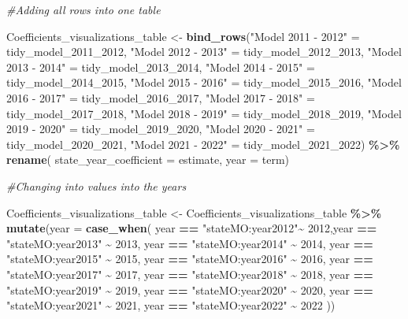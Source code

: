 \documentclass[
]{article}
\newenvironment{Shaded}{\begin{snugshade}}{\end{snugshade}}
\newcommand{\AttributeTok}[1]{\textcolor[rgb]{0.13,0.29,0.53}{#1}}
\newcommand{\CommentTok}[1]{\textcolor[rgb]{0.56,0.35,0.01}{\textit{#1}}}
\newcommand{\DecValTok}[1]{\textcolor[rgb]{0.00,0.00,0.81}{#1}}
\newcommand{\FunctionTok}[1]{\textcolor[rgb]{0.13,0.29,0.53}{\textbf{#1}}}
\newcommand{\NormalTok}[1]{#1}
\newcommand{\OtherTok}[1]{\textcolor[rgb]{0.56,0.35,0.01}{#1}}
\newcommand{\SpecialCharTok}[1]{\textcolor[rgb]{0.81,0.36,0.00}{\textbf{#1}}}
\newcommand{\StringTok}[1]{\textcolor[rgb]{0.31,0.60,0.02}{#1}}
\begin{document}
\begin{Shaded}
\begin{Highlighting}[]
\CommentTok{\#Adding all rows into one table}

\NormalTok{Coefficients\_visualizations\_table }\OtherTok{\textless{}{-}} \FunctionTok{bind\_rows}\NormalTok{(}\StringTok{"Model 2011 {-} 2012"} \OtherTok{=}\NormalTok{ tidy\_model\_2011\_2012, }\StringTok{"Model 2012 {-} 2013"} \OtherTok{=}\NormalTok{ tidy\_model\_2012\_2013, }\StringTok{"Model 2013 {-} 2014"} \OtherTok{=}\NormalTok{ tidy\_model\_2013\_2014, }\StringTok{"Model 2014 {-} 2015"} \OtherTok{=}\NormalTok{ tidy\_model\_2014\_2015, }\StringTok{"Model 2015 {-} 2016"} \OtherTok{=}\NormalTok{ tidy\_model\_2015\_2016, }\StringTok{"Model 2016 {-} 2017"} \OtherTok{=}\NormalTok{ tidy\_model\_2016\_2017, }\StringTok{"Model 2017 {-} 2018"} \OtherTok{=}\NormalTok{ tidy\_model\_2017\_2018, }\StringTok{"Model 2018 {-} 2019"} \OtherTok{=}\NormalTok{ tidy\_model\_2018\_2019, }\StringTok{"Model 2019 {-} 2020"} \OtherTok{=}\NormalTok{ tidy\_model\_2019\_2020, }\StringTok{"Model 2020 {-} 2021"} \OtherTok{=}\NormalTok{ tidy\_model\_2020\_2021, }\StringTok{"Model 2021 {-} 2022"} \OtherTok{=}\NormalTok{ tidy\_model\_2021\_2022) }\SpecialCharTok{\%\textgreater{}\%} \FunctionTok{rename}\NormalTok{( }\AttributeTok{state\_year\_coefficient =}\NormalTok{ estimate, }\AttributeTok{year =}\NormalTok{ term)}

\CommentTok{\#Changing into values into the years}

\NormalTok{Coefficients\_visualizations\_table }\OtherTok{\textless{}{-}}\NormalTok{ Coefficients\_visualizations\_table }\SpecialCharTok{\%\textgreater{}\%}
  \FunctionTok{mutate}\NormalTok{(}\AttributeTok{year =} \FunctionTok{case\_when}\NormalTok{( year }\SpecialCharTok{==} \StringTok{"stateMO:year2012"}\SpecialCharTok{\textasciitilde{}} \DecValTok{2012}\NormalTok{,year }\SpecialCharTok{==} \StringTok{"stateMO:year2013"} \SpecialCharTok{\textasciitilde{}} \DecValTok{2013}\NormalTok{, year }\SpecialCharTok{==} \StringTok{"stateMO:year2014"} \SpecialCharTok{\textasciitilde{}} \DecValTok{2014}\NormalTok{, year }\SpecialCharTok{==} \StringTok{"stateMO:year2015"} \SpecialCharTok{\textasciitilde{}} \DecValTok{2015}\NormalTok{, year }\SpecialCharTok{==} \StringTok{"stateMO:year2016"} \SpecialCharTok{\textasciitilde{}} \DecValTok{2016}\NormalTok{, year }\SpecialCharTok{==} \StringTok{"stateMO:year2017"} \SpecialCharTok{\textasciitilde{}} \DecValTok{2017}\NormalTok{, year }\SpecialCharTok{==} \StringTok{"stateMO:year2018"} \SpecialCharTok{\textasciitilde{}} \DecValTok{2018}\NormalTok{, year }\SpecialCharTok{==} \StringTok{"stateMO:year2019"} \SpecialCharTok{\textasciitilde{}} \DecValTok{2019}\NormalTok{, year }\SpecialCharTok{==} \StringTok{"stateMO:year2020"} \SpecialCharTok{\textasciitilde{}} \DecValTok{2020}\NormalTok{, year }\SpecialCharTok{==} \StringTok{"stateMO:year2021"} \SpecialCharTok{\textasciitilde{}} \DecValTok{2021}\NormalTok{, year }\SpecialCharTok{==} \StringTok{"stateMO:year2022"} \SpecialCharTok{\textasciitilde{}} \DecValTok{2022}
\NormalTok{          ))}


\end{Highlighting}
\end{Shaded}
\end{document}
